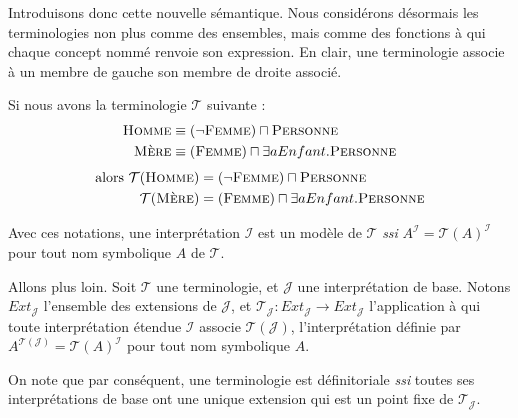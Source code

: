 \par Introduisons donc cette nouvelle sémantique. Nous considérons désormais les terminologies non plus comme des ensembles, mais comme des fonctions à qui chaque concept nommé renvoie son expression. En clair, une terminologie associe à un membre de gauche son membre de droite associé.
\begin{exemple}
  \par Si nous avons la terminologie $\mathcal{T}$ suivante :
  \begin{align}
    \textsc{Homme} & \equiv (\neg \textsc{Femme})\sqcap\textsc{Personne} \\
    \textsc{Mère} & \equiv (\textsc{Femme})\sqcap\exists aEnfant.\textsc{Personne}
  \end{align}
  \begin{align}
    \mbox{alors }
    \mathcal{T}(\textsc{Homme}) & = (\neg \textsc{Femme}) \sqcap \textsc{Personne} \\
    \mathcal{T}(\textsc{Mère}) & = (\textsc{Femme})\sqcap\exists aEnfant.\textsc{Personne}
  \end{align}
\end{exemple}

\par Avec ces notations, une interprétation $\mathcal{I}$ est un modèle de $\mathcal{T}$ \emph{ssi} $A^\mathcal{I} = \mathcal{T}(A)^\mathcal{I}$ pour tout nom symbolique $A$ de $\mathcal{T}$.

\par Allons plus loin. Soit $\mathcal{T}$ une terminologie, et $\mathcal{J}$ une interprétation de base. Notons $Ext_\mathcal{J}$ l'ensemble des extensions de $\mathcal{J}$, et $\mathcal{T}_\mathcal{J} : Ext_\mathcal{J} \longrightarrow Ext_\mathcal{J}$ l'application à qui toute interprétation étendue $\mathcal{I}$ associe $\mathcal{T}(\mathcal{J})$, l'interprétation  définie par $A^{\mathcal{T}(\mathcal{J})} = \mathcal{T}(A)^\mathcal{I}$ pour tout nom symbolique $A$.


\par On note que par conséquent, une terminologie est définitoriale \emph{ssi} toutes ses interprétations de base ont une unique extension qui est un point fixe de $\mathcal{T}_\mathcal{J}$.

